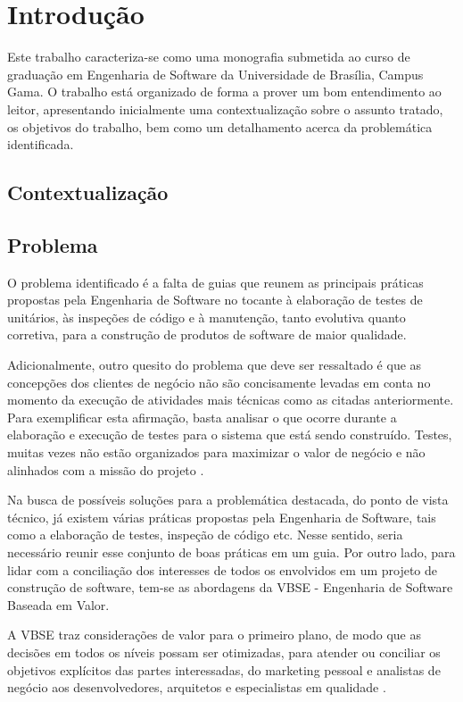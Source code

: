 \chapter{Introdução}

Este trabalho caracteriza-se como uma monografia submetida ao curso de graduação em Engenharia de Software da Universidade de Brasília, Campus Gama. O trabalho está organizado de forma a prover um bom entendimento ao leitor, apresentando inicialmente uma contextualização sobre o assunto tratado, os objetivos do trabalho, bem como um detalhamento acerca da problemática identificada.

\section{Contextualização}

\section{Problema}

O problema identificado é a falta de guias que reunem as principais práticas propostas pela Engenharia de Software no tocante à elaboração de testes de unitários, às inspeções de código e à manutenção, tanto evolutiva quanto corretiva, para a construção de produtos de software de maior qualidade.

Adicionalmente, outro quesito do problema que deve ser ressaltado é que as concepções dos clientes de negócio não são concisamente levadas em conta no momento da execução de atividades mais técnicas como as citadas anteriormente. Para exemplificar esta afirmação, basta analisar o que ocorre durante a elaboração e execução de testes para o sistema que está sendo construído. Testes, muitas vezes não estão organizados para maximizar o valor de negócio e não alinhados com a missão do projeto \cite{vbse2}.

Na busca de possíveis soluções para a problemática destacada, do ponto de vista técnico, já existem várias práticas propostas pela Engenharia de Software, tais como a elaboração de testes, inspeção de código etc. Nesse sentido, seria necessário reunir esse conjunto de boas práticas em um guia. Por outro lado, para lidar com a conciliação dos interesses de todos os envolvidos em um projeto de construção de software, tem-se as abordagens da VBSE - Engenharia de Software Baseada em Valor.

A VBSE traz considerações de valor para o primeiro plano, de modo que as decisões em todos os níveis possam ser otimizadas, para atender ou conciliar os objetivos explícitos das partes interessadas, do marketing pessoal e analistas de negócio aos desenvolvedores, arquitetos e especialistas em qualidade \cite{vbse1}.

